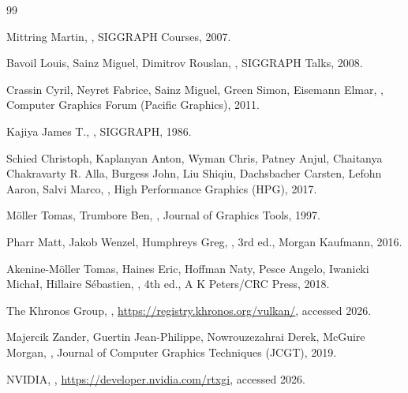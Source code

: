 \begin{thebibliography}{99}

Mittring Martin, , SIGGRAPH Courses, 2007.

Bavoil Louis, Sainz Miguel, Dimitrov Rouslan, ,
SIGGRAPH Talks, 2008.

Crassin Cyril, Neyret Fabrice, Sainz Miguel, Green Simon, Eisemann Elmar, , Computer Graphics Forum (Pacific Graphics), 2011.

Kajiya James T., , SIGGRAPH, 1986.

Schied Christoph, Kaplanyan Anton, Wyman Chris, Patney Anjul, Chaitanya Chakravarty R. Alla, Burgess
John, Liu Shiqiu, Dachsbacher Carsten, Lefohn Aaron, Salvi Marco, , High Performance Graphics
(HPG), 2017.

M\"oller Tomas, Trumbore Ben, , Journal of
Graphics Tools, 1997.

Pharr Matt, Jakob Wenzel, Humphreys Greg, , 3rd ed., Morgan Kaufmann, 2016.

Akenine-M\"oller Tomas, Haines Eric, Hoffman Naty, Pesce Angelo, Iwanicki Micha\l{}, Hillaire
S\'ebastien, , 4th ed., A K Peters/CRC Press, 2018.

The Khronos Group, , \url{https://registry.khronos.org/vulkan/}, accessed 2026.

Majercik Zander, Guertin Jean-Philippe, Nowrouzezahrai Derek, McGuire Morgan, , Journal of Computer Graphics Techniques
(JCGT), 2019.

NVIDIA, , \url{https://developer.nvidia.com/rtxgi}, accessed
2026.


\end{thebibliography}
